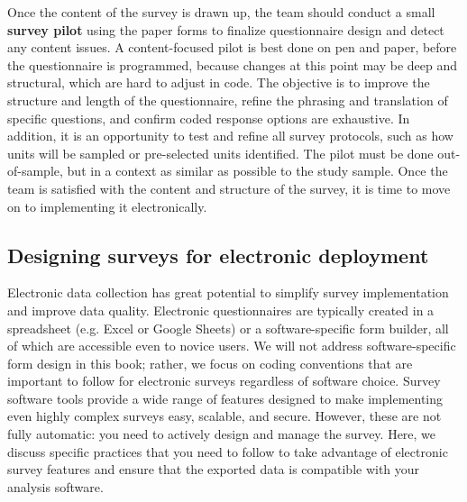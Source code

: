 Once the content of the survey is drawn up,
the team should conduct a small \textbf{survey pilot}
using the paper forms to finalize questionnaire design and detect any content issues.
A content-focused pilot
is best done on pen and paper, before the questionnaire is programmed,
because changes at this point may be deep and structural, which are hard to adjust in code.
The objective is to improve the structure and length of the questionnaire,
refine the phrasing and translation of specific questions,
and confirm coded response options are exhaustive.
In addition, it is an opportunity to test and refine all survey protocols,
such as how units will be sampled or pre-selected units identified.
The pilot must be done out-of-sample,
but in a context as similar as possible to the study sample.
Once the team is satisfied with the content and structure of the survey,
it is time to move on to implementing it electronically.

\subsection{Designing surveys for electronic deployment}

Electronic data collection has great potential to simplify survey implementation and improve data quality.
Electronic questionnaires are typically created in a spreadsheet (e.g. Excel or Google Sheets)
or a software-specific form builder, all of which are accessible even to novice users.
We will not address software-specific form design in this book;
rather, we focus on coding conventions that are important to follow
for electronic surveys regardless of software choice.
Survey software tools provide a wide range of features
designed to make implementing even highly complex surveys easy, scalable, and secure.
However, these are not fully automatic: you need to actively design and manage the survey.
Here, we discuss specific practices that you need to follow
to take advantage of electronic survey features
and ensure that the exported data is compatible with your analysis software.

